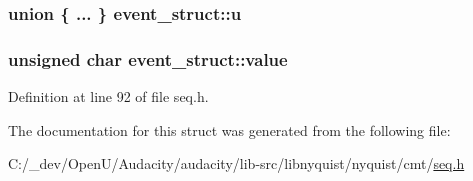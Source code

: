 \subsubsection[{\texorpdfstring{u}{u}}]{\setlength{\rightskip}{0pt plus 5cm}union \{ ... \}   event\+\_\+struct\+::u}\hypertarget{structevent__struct_a60cb93d3e3c595ac444342c496e97d71}{}\label{structevent__struct_a60cb93d3e3c595ac444342c496e97d71}
\subsubsection[{\texorpdfstring{value}{value}}]{\setlength{\rightskip}{0pt plus 5cm}unsigned char event\+\_\+struct\+::value}\hypertarget{structevent__struct_afcefbf02b552912c716669fa2fffb997}{}\label{structevent__struct_afcefbf02b552912c716669fa2fffb997}


Definition at line 92 of file seq.\+h.



The documentation for this struct was generated from the following file\+:\begin{DoxyCompactItemize}
\item 
C\+:/\+\_\+dev/\+Open\+U/\+Audacity/audacity/lib-\/src/libnyquist/nyquist/cmt/\hyperlink{seq_8h}{seq.\+h}\end{DoxyCompactItemize}
